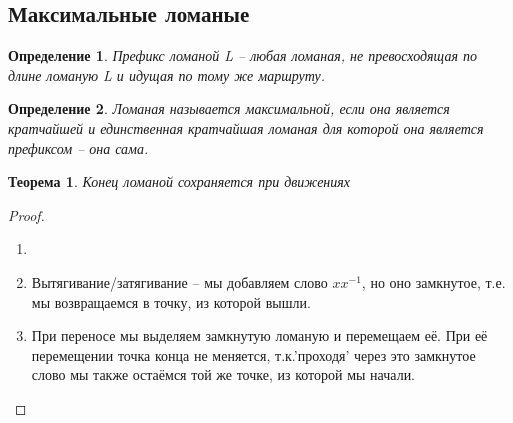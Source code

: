 \documentclass[12pt,a4paper, flushleft]{article}
\newtheorem{Def}{Определение}[section]
\newtheorem{Th}{Теорема}[section]
\begin{document}
\subsection{Максимальные ломаные}

\begin{Def}
	Префикс ломаной L -- любая ломаная, не превосходящая по длине ломаную L и идущая по тому же маршруту. 
\end{Def}

\begin{Def}
	Ломаная называется максимальной, если она является кратчайшей и единственная кратчайшая ломаная для которой она является префиксом -- она сама.
\end{Def}

\begin{Th}
	Конец ломаной сохраняется при движениях
\end{Th}
\begin{proof}
	\begin{enumerate}
		\item []
		\item Вытягивание/затягивание -- мы добавляем слово $xx^{-1}$, но оно замкнутое, т.е. мы возвращаемся в точку, из которой вышли.
		\item При переносе мы выделяем замкнутую ломаную и перемещаем её. При её перемещении  точка конца не меняется, т.к.'проходя' через это замкнутое слово мы также остаёмся той же точке, из которой мы начали.
	\end{enumerate}
\end{proof}
\end{document}
